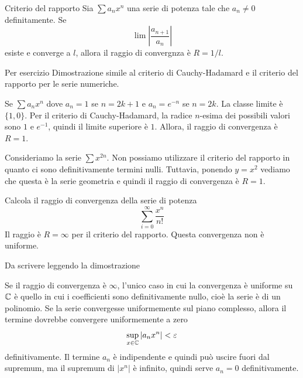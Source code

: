 \documentclass[a4paper]{article}
\begin{document}
\begin{snippettheorem}{Criterio del rapporto}
    Sia \(\sum a_nx^n\)
    una serie di potenza tale che \(a_n \neq 0\) definitamente.
    Se \[
        \lim\left|
            \frac{a_{n+1}}{a_n}
        \right|
    \]
    esiste e converge a \(l\), allora il raggio di convergnza è \(R = 1/l\).
\end{snippettheorem}

\begin{snippetproof}{Per esercizio}
    Dimostrazione simile al criterio di Cauchy-Hadamard e
    il criterio del rapporto per le serie numeriche.
\end{snippetproof}

\begin{snippetexample}{}
    Se \(\sum a_n x^n\) dove \(a_n = 1\) se \(n = 2k+1\)
    e \(a_n = e^{-n}\) se \(n = 2k\).
    La classe limite è \(\{1, 0\}\).
    Per il criterio di Cauchy-Hadamard,
    la radice \(n\)-esima dei possibili valori sono \(1\) e \(e^{-1}\),
    quindi il limite superiore è \(1\).
    Allora, il raggio di convergenza è \(R=1\).
\end{snippetexample}

\begin{snippetexample}{}
    Consideriamo la serie \(\sum x^{2n}\).
    Non possiamo utilizzare il criterio del rapporto
    in quanto ci sono definitivamente termini nulli.
    Tuttavia,
    ponendo \(y = x^2\) vediamo che questa è la serie geometria e quindi il raggio di
    convergenza è \(R=1\).
\end{snippetexample}

\begin{snippetexample}{}
    Calcola il raggio di convergenza della serie di potenza
    \[
        \sum_{i=0}^\infty \frac{x^n}{n!}
    \]
    Il raggio è \(R=\infty\) per il criterio del rapporto.
    Questa convergenza non è uniforme.
\end{snippetexample}

\begin{snippetproposition}{}
    Da scrivere leggendo la dimostrazione
\end{snippetproposition}

\begin{snippetproof}{}
    Se il raggio di convergenza è \(\infty\),
    l'unico caso in cui la convergenza è uniforme su \(\mathbb{C}\)
    è quello in cui i coefficienti sono definitivamente nullo, cioè
    la serie è di un polinomio.
    Se la serie convergesse uniformemente sul piano complesso,
    allora il termine dovrebbe convergere uniformemente a zero
    \[
        \sup_{x \in \mathbb{C}} |a_nx^n| < \varepsilon
    \]
    definitivamente.
    Il termine \(a_n\) è indipendente e quindi può uscire fuori dal supremum,
    ma il supremum di \(|x^n|\) è infinito, quindi serve \(a_n = 0\) definitivamente.
\end{snippetproof}
\end{document}
